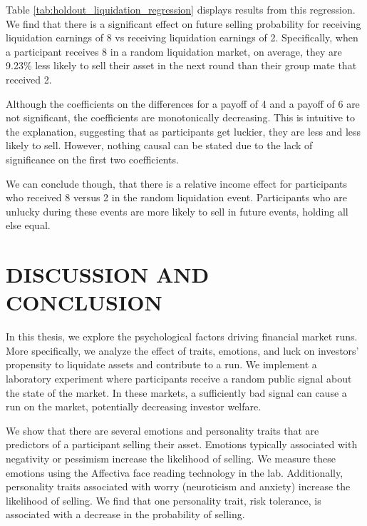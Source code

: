 \documentclass[thesis]{uathesis}
\begin{document}
\begin{body}
\begin{table}[H]
  \centering
  \caption{Effect of holdout liquidation payoff on next-round selling}
  \label{tab:holdout_liquidation_regression}
  
\end{table}

Table \ref{tab:holdout_liquidation_regression} displays results from this regression. We find that there is a significant effect on future selling probability for receiving liquidation earnings of 8 vs receiving liquidation earnings of 2. Specifically, when a participant receives 8 in a random liquidation market, on average, they are 9.23\% less likely to sell their asset in the next round than their group mate that received 2.

Although the coefficients on the differences for a payoff of 4 and a payoff of 6 are not significant, the coefficients are monotonically decreasing. This is intuitive to the explanation, suggesting that as participants get luckier, they are less and less likely to sell. However, nothing causal can be stated due to the lack of significance on the first two coefficients.

We can conclude though, that there is a relative income effect for participants who received 8 versus 2 in the random liquidation event. Participants who are unlucky during these events are more likely to sell in future events, holding all else equal.


\chapter{DISCUSSION AND CONCLUSION}

In this thesis, we explore the psychological factors driving financial market runs. More specifically, we analyze the effect of traits, emotions, and luck on investors' propensity to liquidate assets and contribute to a run. We implement a laboratory experiment where participants receive a random public signal about the state of the market. In these markets, a sufficiently bad signal can cause a run on the market, potentially decreasing investor welfare.

We show that there are several emotions and personality traits that are predictors of a participant selling their asset. Emotions typically associated with negativity or pessimism increase the likelihood of selling. We measure these emotions using the Affectiva face reading technology in the lab. Additionally, personality traits associated with worry (neuroticism and anxiety) increase the likelihood of selling. We find that one personality trait, risk tolerance, is associated with a decrease in the probability of selling.


\end{body}
\end{document}
